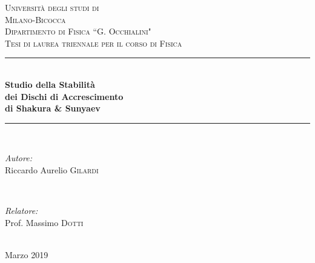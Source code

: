 \documentclass[a4paperbi]{article}
\newcommand{\HRule}{\rule{\linewidth}{0.5mm}} %
\begin{document}
\begin{titlepage}
\center %
\textsc{\LARGE Università degli studi di}\\[0.1cm]
\textsc{\LARGE Milano-Bicocca}\\[1.2cm] %
\textsc{\Large Dipartimento di Fisica ``G. Occhialini"}\\[0.5cm] %
\textsc{\large Tesi di laurea triennale per il corso di Fisica}\\[0.5cm] %
\HRule \\[0.4cm]
{ \huge \bfseries Studio della Stabilità}\\[0.1cm]
{ \huge \bfseries dei Dischi di Accrescimento}\\[0.1cm]
{ \huge \bfseries  di Shakura \& Sunyaev}\\[0.4cm] %
\HRule \\[1.5cm]
\begin{minipage}{0.4\textwidth}
\begin{flushleft} \large
\emph{Autore:}\\
Riccardo Aurelio \textsc{Gilardi} %
\end{flushleft}
\end{minipage}
~
\begin{minipage}{0.4\textwidth}
\begin{flushright} \large
\emph{Relatore:} \\
Prof. Massimo \textsc{Dotti} %
\end{flushright}
\end{minipage}\\[2cm]
{\large Marzo 2019}\\[1cm] %

\end{titlepage}
\end{document}
